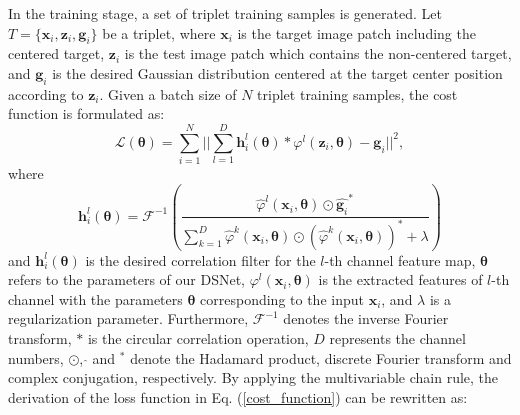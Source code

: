 \documentclass[runningheads]{llncs}
\begin{document}
In the training stage, a set of triplet training samples is generated. Let $T=\{\mathbf{x}_{i}, \mathbf{z}_{i}, \mathbf{g}_{i}\}$ be a triplet, where $\mathbf{x}_{i}$ is the target image patch including the centered target, $\mathbf{z}_{i}$ is the test image patch which contains the non-centered target, and $\mathbf{g}_{i}$ is the desired Gaussian distribution centered at the target center position according to $\mathbf{z}_{i}$. Given a  batch size of $N$ triplet training samples, the cost function is formulated as:
\begin{equation}\label{cost_function}
  \mathcal{L}(\mathbf{\theta}) = \sum_{i=1}^{N}{||\sum_{l=1}^{D}{\mathbf{h}_{i}^{l}(\mathbf{\theta})} \ast \varphi^{l}(\mathbf{z}_{i}, \mathbf{\theta})-\mathbf{g}_{i}||^2},
\end{equation}
where
\begin{equation}\label{cost_function2}
\mathbf{h}_{i}^{l}(\mathbf{\theta}) = \mathcal{F}^{-1}(\frac{\hat{\varphi}^{l}(\mathbf{x}_{i}, \mathbf{\theta}) \odot \hat{\mathbf{g}_{i}}^{\ast}}{\sum_{k=1}^{D}{\hat{\varphi}^{k}(\mathbf{x}_{i}, \mathbf{\theta}) \odot (\hat{\varphi}^{k}(\mathbf{x}_{i}, \mathbf{\theta}))^{\ast}+\lambda}})
\end{equation}
and $\mathbf{h}_{i}^{l}(\mathbf{\theta})$ is the desired correlation filter for the $l$-th channel feature map,  $\mathbf{\theta}$ refers to the parameters of our DSNet, $\varphi^{l}(\mathbf{x}_{i}, \mathbf{\theta})$ is the extracted features of $l$-th channel with the parameters $\mathbf{\theta}$ corresponding to the input $\mathbf{x}_{i}$, and $\lambda$ is a regularization parameter. Furthermore, $\mathcal{F}^{-1}$ denotes the inverse Fourier transform, $\ast$ is the circular correlation operation, $D$ represents the channel numbers, $\odot$, $\hat{}$ and ${}^{\ast}$ denote the Hadamard product, discrete Fourier transform and complex conjugation, respectively. By applying the multivariable chain rule, the derivation of the loss function in Eq. (\ref{cost_function}) can be rewritten as:
\end{document}
